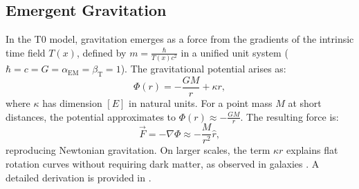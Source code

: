\documentclass[12pt,a4paper]{article}
\newcommand{\Tfield}{T(x)}
\newcommand{\betaT}{\beta_{\text{T}}}
\newcommand{\alphaEM}{\alpha_{\text{EM}}}
\begin{document}
	\subsection{Emergent Gravitation}
	In the T0 model, gravitation emerges as a force from the gradients of the intrinsic time field \(\Tfield\), defined by \( m = \frac{\hbar}{\Tfield c^2} \) in a unified unit system (\(\hbar = c = G = \alphaEM = \betaT = 1\)). The gravitational potential arises as:
	\begin{equation}
		\Phi(r) = -\frac{G M}{r} + \kappa r,
	\end{equation}
	where \(\kappa\) has dimension \([E]\) in natural units. For a point mass \(M\) at short distances, the potential approximates to \(\Phi(r) \approx -\frac{GM}{r}\). The resulting force is:
	\begin{equation}
		\vec{F} = -\nabla \Phi \approx -\frac{M}{r^2} \hat{r},
	\end{equation}
	reproducing Newtonian gravitation. On larger scales, the term \(\kappa r\) explains flat rotation curves without requiring dark matter, as observed in galaxies \cite{rubin1980, McGaugh2016}. A detailed derivation is provided in \cite{pascher_emergente_gravitation_2025, pascher_alphabeta_2025}.
	
\end{document}
